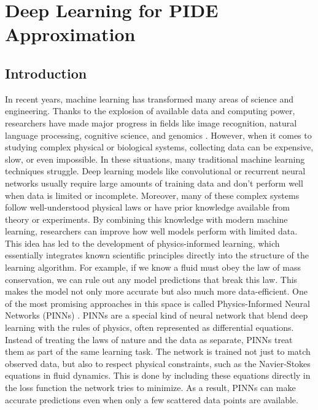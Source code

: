 \documentclass[11pt,twoside,openright]{report}
\begin{document}
\chapter{Deep Learning for PIDE Approximation}
\label{ch:deep_learning_for_pide_approximation}

\section{Introduction}
\label{sec:Resources}

In recent years, machine learning has transformed many areas of science and engineering. Thanks to the explosion of available data and computing power, researchers have made major progress in fields like image recognition, natural language processing, cognitive science, and genomics \cite{abadi2016tensorflow}. However, when it comes to studying complex physical or biological systems, collecting data can be expensive, slow, or even impossible. In these situations, many traditional machine learning techniques struggle. Deep learning models like convolutional or recurrent neural networks usually require large amounts of training data and don't perform well when data is limited or incomplete.
Moreover, many of these complex systems follow well-understood physical laws or have prior knowledge available from theory or experiments. By combining this knowledge with modern machine learning, researchers can improve how well models perform with limited data. This idea has led to the development of physics-informed learning, which essentially integrates known scientific principles directly into the structure of the learning algorithm. For example, if we know a fluid must obey the law of mass conservation, we can rule out any model predictions that break this law. This makes the model not only more accurate but also much more data-efficient.
One of the most promising approaches in this space is called Physics-Informed Neural Networks (PINNs) \cite{raissi2019physics}. PINNs are a special kind of neural network that blend deep learning with the rules of physics, often represented as differential equations. Instead of treating the laws of nature and the data as separate, PINNs treat them as part of the same learning task. The network is trained not just to match observed data, but also to respect physical constraints, such as the Navier-Stokes equations in fluid dynamics. This is done by including these equations directly in the loss function the network tries to minimize. As a result, PINNs can make accurate predictions even when only a few scattered data points are available.
\end{document}
